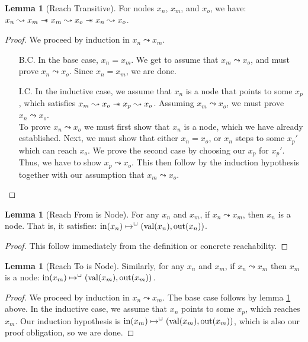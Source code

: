 \documentclass[a4paper, 10pt]{report}
\theoremstyle{definition}
\newtheorem{lemma}[theorem]{Lemma}
\newcommand{\nIn}[1]{\operatorname{in}(#1)}
\newcommand{\nVal}[1]{\operatorname{val}(#1)}
\newcommand{\nOut}[1]{\operatorname{out}(#1)}
\newcommand{\node}{x}
\newcommand{\nodeM}[1]{\node_{#1}}
\newcommand{\isNode}[1]{\nIn{#1} \mapsto^{\persistently} (\nVal{#1}, \nOut{#1})}
\newcommand{\reach}[2]{#1 \leadsto #2}
\begin{document}
\begin{lemma}[Reach Transitive]\label{lemma:reach-transitive}
  For nodes $\nodeM{n}$, $\nodeM{m}$, and $\nodeM{o}$, we have: $\reach{\nodeM{n}}{\nodeM{m}} \wand \reach{\nodeM{m}}{\nodeM{o}} \wand \reach{\nodeM{n}}{\nodeM{o}}$.
\end{lemma}
\begin{proof}
  We proceed by induction in $\reach{\nodeM{n}}{\nodeM{m}}$.
  \begin{itemize}
    \item[B.C.] In the base case, $\nodeM{n} = \nodeM{m}$. We get to assume that $\reach{\nodeM{m}}{\nodeM{o}}$, and must prove $\reach{\nodeM{n}}{\nodeM{o}}$. Since $\nodeM{n} = \nodeM{m}$, we are done.
    \item[I.C.] In the inductive case, we assume that $\nodeM{n}$ is a node that points to some $\nodeM{p}$, which satisfies $\reach{\nodeM{m}}{\nodeM{o}} \wand \reach{\nodeM{p}}{\nodeM{o}}$. Assuming $\reach{\nodeM{m}}{\nodeM{o}}$, we must prove $\reach{\nodeM{n}}{\nodeM{o}}$.\\
    To prove $\reach{\nodeM{n}}{\nodeM{o}}$ we must first show that $\nodeM{n}$ is a node, which we have already established. Next, we must show that either $\nodeM{n} = \nodeM{o}$, or $\nodeM{n}$ steps to some $\nodeM{p}'$ which can reach $\nodeM{o}$. We prove the second case by choosing our $\nodeM{p}$ for $\nodeM{p}'$. Thus, we have to show $\reach{\nodeM{p}}{\nodeM{o}}$. This then follow by the induction hypothesis together with our assumption that $\reach{\nodeM{m}}{\nodeM{o}}$.
  \end{itemize}
\end{proof}

\begin{lemma}[Reach From is Node]\label{lemma:reach-from-is-node}
  For any $\nodeM{n}$ and $\nodeM{m}$, if $\reach{\nodeM{n}}{\nodeM{m}}$, then $\nodeM{n}$ is a node. That is, it satisfies: $\isNode{\nodeM{n}}$.
\end{lemma}
\begin{proof}
  This follow immediately from the definition or concrete reachability.
\end{proof}

\begin{lemma}[Reach To is Node]\label{lemma:reach-to-is-node}
  Similarly, for any $\nodeM{n}$ and $\nodeM{m}$, if 
  $\reach{\nodeM{n}}{\nodeM{m}}$ then $\nodeM{m}$ is a node: $\isNode{\nodeM{m}}$.
\end{lemma}
\begin{proof}
  We proceed by induction in $\reach{\nodeM{n}}{\nodeM{m}}$. The base case follows by lemma \ref{lemma:reach-from-is-node} above. In the inductive case, we assume that $\nodeM{n}$ points to some $\nodeM{p}$, which reaches $\nodeM{m}$. Our induction hypothesis is $\isNode{\nodeM{m}}$, which is also our proof obligation, so we are done.
\end{proof}
\end{document}
